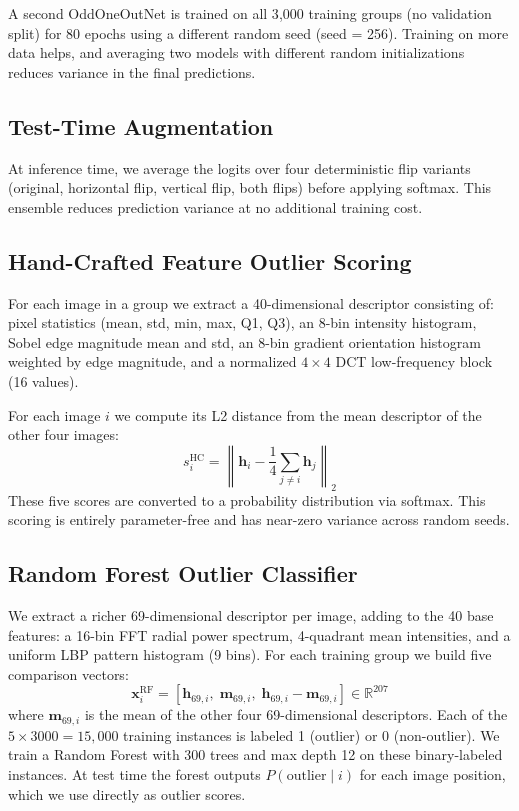 \documentclass[11pt]{article}
\begin{document}
A second OddOneOutNet is trained on all 3{,}000 training groups (no validation split) for 80 epochs
using a different random seed (seed = 256). Training on more data helps, and averaging two models
with different random initializations reduces variance in the final predictions.

\subsection{Test-Time Augmentation}

At inference time, we average the logits over four deterministic flip variants (original, horizontal flip,
vertical flip, both flips) before applying softmax. This ensemble reduces prediction variance at no
additional training cost.

\subsection{Hand-Crafted Feature Outlier Scoring}

For each image in a group we extract a 40-dimensional descriptor consisting of:
pixel statistics (mean, std, min, max, Q1, Q3), an 8-bin intensity histogram, Sobel edge magnitude
mean and std, an 8-bin gradient orientation histogram weighted by edge magnitude, and a normalized
$4\times4$ DCT low-frequency block (16 values).

For each image $i$ we compute its L2 distance from the mean descriptor of the other four images:
\[
  s_i^{\text{HC}} = \left\|\mathbf{h}_i - \frac{1}{4}\sum_{j\neq i}\mathbf{h}_j\right\|_2
\]
These five scores are converted to a probability distribution via softmax. This scoring is entirely
parameter-free and has near-zero variance across random seeds.

\subsection{Random Forest Outlier Classifier}

We extract a richer 69-dimensional descriptor per image, adding to the 40 base features: a 16-bin FFT
radial power spectrum, 4-quadrant mean intensities, and a uniform LBP pattern histogram (9 bins).
For each training group we build five comparison vectors:
\[
  \mathbf{x}_{i}^{\text{RF}} = [\mathbf{h}_{69,i},\; \mathbf{m}_{69,i},\; \mathbf{h}_{69,i} - \mathbf{m}_{69,i}] \in \mathbb{R}^{207}
\]
where $\mathbf{m}_{69,i}$ is the mean of the other four 69-dimensional descriptors. Each of the
$5 \times 3000 = 15{,}000$ training instances is labeled 1 (outlier) or 0 (non-outlier). We train a
Random Forest with 300 trees and max depth 12 on these binary-labeled instances. At test time the
forest outputs $P(\text{outlier} \mid i)$ for each image position, which we use directly as outlier scores.
\end{document}
